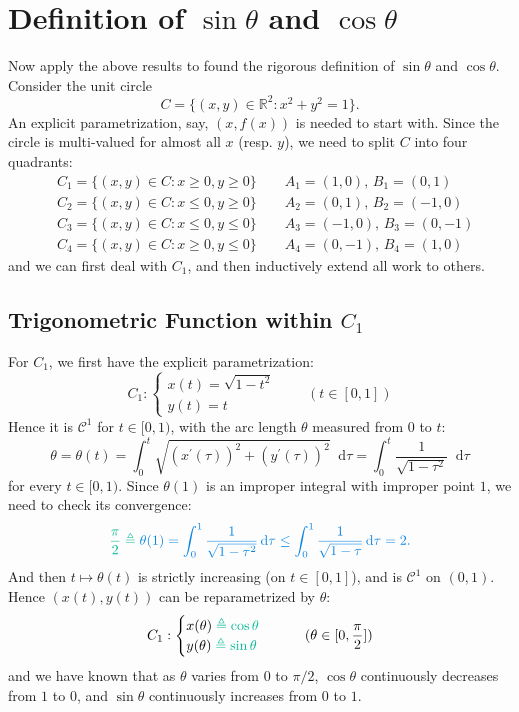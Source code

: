 \documentclass{article}
\newcommand{\dif}{\mathop{}\!\mathrm{d}}
\begin{document}
\section{Definition of $\sin \theta$ and $\cos \theta$}
Now apply the above results to found the rigorous definition of $\sin \theta$ and $\cos \theta$. Consider the unit circle
$$ C = \{ (x, y)\in \mathbb{R}^2: x^2 + y^2 = 1 \}. $$
An explicit parametrization, say, $(x, f(x))$ is needed to start with. Since the circle is multi-valued for almost all $x$ (resp. $y$), we need to split $C$ into four quadrants:
$$
\begin{aligned}
    & C_1 = \{ (x, y)\in C: x\geq 0, y\geq 0 \} \qquad A_1 = (1, 0),\, B_1 = (0, 1) \\
    & C_2 = \{ (x, y)\in C: x\leq 0, y\geq 0 \} \qquad A_2 = (0, 1),\, B_2 = (-1, 0) \\
    & C_3 = \{ (x, y)\in C: x\leq 0, y\leq 0 \} \qquad A_3 = (-1, 0),\, B_3 = (0, -1) \\
    & C_4 = \{ (x, y)\in C: x\geq 0, y\leq 0 \} \qquad A_4 = (0, -1),\, B_4 = (1, 0)
\end{aligned}
$$
and we can first deal with $C_1$, and then inductively extend all work to others. 

\subsection{Trigonometric Function within $C_1$}
For $C_1$, we first have the explicit parametrization:
$$ C_1: 
\begin{cases}
    x(t) = \sqrt{1-t^2} \\
    y(t) = t
\end{cases} \qquad (t\in [0, 1])
$$
Hence it is $\mathcal{C}^1$ for $t\in [0,1)$, with the arc length $\theta$ measured from $0$ to $t$:
$$ \theta = \theta (t) = \int_0^t \sqrt{(x^\prime (\tau))^2 + (y^\prime (\tau))^2}\dif \tau = \int_0^t \frac{1}{\sqrt{1-\tau^2}}\dif \tau $$ 
for every $t\in [0, 1)$. \textcolor{Th}{Since $\theta(1)$ is an improper integral with improper point $1$, we need to check its convergence:}
$$ \textcolor{Df}{\frac{\pi}{2} \triangleq } \;\textcolor{Th}{\theta(1) = \int_0^1 \frac{1}{\sqrt{1-\tau^2}}\dif \tau \leq \int_0^1 \frac{1}{\sqrt{1-\tau}}\dif \tau = 2.} $$
\textcolor{Th}{And then $t\mapsto \theta(t)$ is strictly increasing (on $t\in [0, 1]$), and is $\mathcal{C}^1$ on $(0, 1)$}. Hence $(x(t), y(t))$ can be reparametrized by $\theta$:
$$ C_1:
\begin{cases}
    x(\theta) \; \textcolor{Df}{\triangleq \cos \theta} \\
    y(\theta) \; \textcolor{Df}{\triangleq \sin \theta}
\end{cases} \qquad (\theta\in [0, \frac{\pi}{2}])
$$
and we have known that \textcolor{Th}{as $\theta$ varies from $0$ to $\pi/2$, $\cos \theta$ continuously decreases from $1$ to $0$, and $\sin \theta$ continuously increases from $0$ to $1$.}
\end{document}
